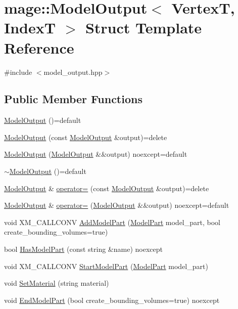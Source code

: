 \hypertarget{structmage_1_1_model_output}{}\section{mage\+:\+:Model\+Output$<$ VertexT, IndexT $>$ Struct Template Reference}
\label{structmage_1_1_model_output}


{\ttfamily \#include $<$model\+\_\+output.\+hpp$>$}

\subsection*{Public Member Functions}
\begin{DoxyCompactItemize}
\item 
\hyperlink{structmage_1_1_model_output_a87c3036fd1e97045c6075ed729a5e8f2}{Model\+Output} ()=default
\item 
\hyperlink{structmage_1_1_model_output_a8aed21d15e5c30a8ec200edf01e5f8fb}{Model\+Output} (const \hyperlink{structmage_1_1_model_output}{Model\+Output} \&output)=delete
\item 
\hyperlink{structmage_1_1_model_output_af0e7804a3b375b18fc7bfba1c6ee84bf}{Model\+Output} (\hyperlink{structmage_1_1_model_output}{Model\+Output} \&\&output) noexcept=default
\item 
\hyperlink{structmage_1_1_model_output_a547ab5a433adfb253fab3431ad4c0dce}{$\sim$\+Model\+Output} ()=default
\item 
\hyperlink{structmage_1_1_model_output}{Model\+Output} \& \hyperlink{structmage_1_1_model_output_a5d206619319fed85a4add63ee0532cac}{operator=} (const \hyperlink{structmage_1_1_model_output}{Model\+Output} \&output)=delete
\item 
\hyperlink{structmage_1_1_model_output}{Model\+Output} \& \hyperlink{structmage_1_1_model_output_a090d74bebb6045c11952cc57fb1aa220}{operator=} (\hyperlink{structmage_1_1_model_output}{Model\+Output} \&\&output) noexcept=default
\item 
void X\+M\+\_\+\+C\+A\+L\+L\+C\+O\+NV \hyperlink{structmage_1_1_model_output_a4cec4d8729150a188605daabd33dd2ba}{Add\+Model\+Part} (\hyperlink{structmage_1_1_model_part}{Model\+Part} model\+\_\+part, bool create\+\_\+bounding\+\_\+volumes=true)
\item 
bool \hyperlink{structmage_1_1_model_output_aec5c98c2c4f64d2cd345a2c868498cfc}{Has\+Model\+Part} (const string \&name) noexcept
\item 
void X\+M\+\_\+\+C\+A\+L\+L\+C\+O\+NV \hyperlink{structmage_1_1_model_output_a204f16513741ebfacb7a287969629956}{Start\+Model\+Part} (\hyperlink{structmage_1_1_model_part}{Model\+Part} model\+\_\+part)
\item 
void \hyperlink{structmage_1_1_model_output_a88f2dff99e178b84637ae945ba5f6f53}{Set\+Material} (string material)
\item 
void \hyperlink{structmage_1_1_model_output_a24619ec445b3a122ce4b50a6f2f74158}{End\+Model\+Part} (bool create\+\_\+bounding\+\_\+volumes=true) noexcept
\end{DoxyCompactItemize}
